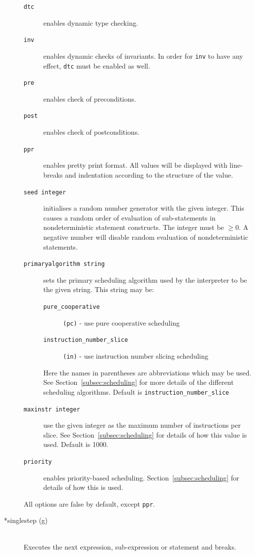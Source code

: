 \documentclass[\pformat,12pt]{article}
\begin{document}
\begin{description}
  \begin{description}
  \item[{\tt dtc}] enables dynamic type checking.
  \item[{\tt inv}] enables dynamic checks of invariants. In order for
    {\tt inv} to have any effect, {\tt dtc} must be enabled as well.
  \item[{\tt pre}] enables check of preconditions.
  \item[{\tt post}] enables check of postconditions.
  \item[{\tt ppr}] enables pretty print format. All values will be
    displayed with line-breaks and indentation according to the
    structure of the value.
  \item[{\tt seed integer}] initialises a random number generator with
    the given integer.  This causes a random order of evaluation of
    sub-statements in nondeterministic statement constructs.  The
    integer must be $\geq 0$. A negative number will disable random
    evaluation of nondeterministic statements.
  \item[{\tt primaryalgorithm string}] sets the primary scheduling
    algorithm used by the interpreter to be the given string. This
    string may be:
    \begin{description}
    \item[{\tt pure\_cooperative}] \texttt{(pc)} - use pure cooperative scheduling
    \item[{\tt instruction\_number\_slice}] \texttt{(in)} - use instruction number slicing scheduling
    \end{description}
    Here the names in parentheses are abbreviations which may be
    used. See Section~\ref{subsec:scheduling} for more details of the
    different scheduling algorithms. Default is 
    {\tt instruction\_number\_slice}
  \item[{\tt maxinstr integer}] use the given integer as the maximum
    number of instructions per slice. See
    Section~\ref{subsec:scheduling} for details of how this value is
    used. Default is 1000.
  \item[{\tt priority}] enables priority-based scheduling.
    Section~\ref{subsec:scheduling} for details of how this is
    used. 
  \end{description}
  
  All options are false by default, except {\tt ppr}.
 
\item[*singlestep (g)] \mbox{}\\
  Executes the next expression, sub-expression or statement
  and breaks.


\end{description}
\end{document}
